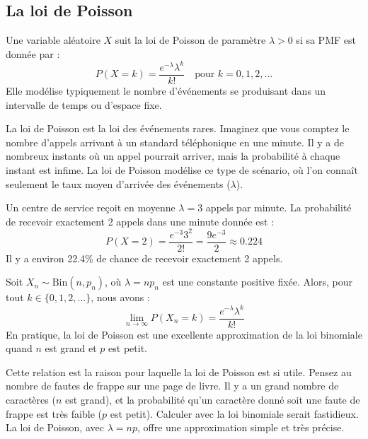 \subsection{La loi de Poisson}

\begin{definitionbox}
Une variable aléatoire $X$ suit la loi de Poisson de paramètre $\lambda > 0$ si sa PMF est donnée par :
$$ P(X=k) = \frac{e^{-\lambda} \lambda^k}{k!} \quad \text{pour } k=0, 1, 2, \dots $$
Elle modélise typiquement le nombre d'événements se produisant dans un intervalle de temps ou d'espace fixe.
\end{definitionbox}

\begin{intuitionbox}
La loi de Poisson est la loi des événements rares. Imaginez que vous comptez le nombre d'appels arrivant à un standard téléphonique en une minute. Il y a de nombreux instants où un appel pourrait arriver, mais la probabilité à chaque instant est infime. La loi de Poisson modélise ce type de scénario, où l'on connaît seulement le taux moyen d'arrivée des événements ($\lambda$).
\end{intuitionbox}

\begin{examplebox}
Un centre de service reçoit en moyenne $\lambda=3$ appels par minute. La probabilité de recevoir exactement 2 appels dans une minute donnée est :
$$ P(X=2) = \frac{e^{-3} 3^2}{2!} = \frac{9e^{-3}}{2} \approx 0.224 $$
Il y a environ 22.4\% de chance de recevoir exactement 2 appels.
\end{examplebox}

\begin{theorembox}
Soit $X_n \sim \text{Bin}(n, p_n)$, où $\lambda = np_n$ est une constante positive fixée. Alors, pour tout $k \in \{0, 1, 2, \dots\}$, nous avons :
$$ \lim_{n \to \infty} P(X_n=k) = \frac{e^{-\lambda}\lambda^k}{k!} $$
En pratique, la loi de Poisson est une excellente approximation de la loi binomiale quand $n$ est grand et $p$ est petit.
\end{theorembox}

\begin{intuitionbox}
Cette relation est la raison pour laquelle la loi de Poisson est si utile. Pensez au nombre de fautes de frappe sur une page de livre. Il y a un grand nombre de caractères ($n$ est grand), et la probabilité qu'un caractère donné soit une faute de frappe est très faible ($p$ est petit). Calculer avec la loi binomiale serait fastidieux. La loi de Poisson, avec $\lambda=np$, offre une approximation simple et très précise.
\end{intuitionbox}


